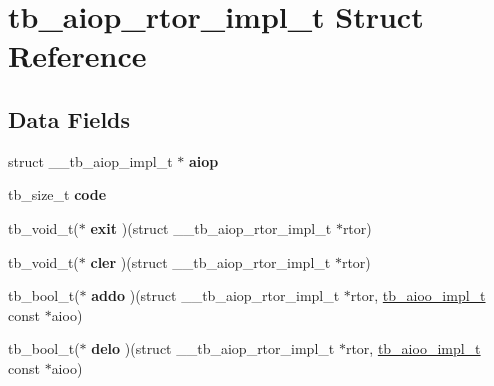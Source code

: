 \hypertarget{structtb__aiop__rtor__impl__t}{\section{tb\-\_\-aiop\-\_\-rtor\-\_\-impl\-\_\-t Struct Reference}
\label{structtb__aiop__rtor__impl__t}
}
\subsection*{Data Fields}
\begin{DoxyCompactItemize}
\item 
\hypertarget{structtb__aiop__rtor__impl__t_a2ed30f0f119bc7a4a3bf8b7a6e9f7530}{struct \-\_\-\-\_\-tb\-\_\-aiop\-\_\-impl\-\_\-t $\ast$ {\bfseries aiop}}\label{structtb__aiop__rtor__impl__t_a2ed30f0f119bc7a4a3bf8b7a6e9f7530}

\item 
\hypertarget{structtb__aiop__rtor__impl__t_abe6b9ef7542f3c279b5b801a87a54ffe}{tb\-\_\-size\-\_\-t {\bfseries code}}\label{structtb__aiop__rtor__impl__t_abe6b9ef7542f3c279b5b801a87a54ffe}

\item 
\hypertarget{structtb__aiop__rtor__impl__t_aadf27ce34b7b72a60fb269d77a5a2e9a}{tb\-\_\-void\-\_\-t($\ast$ {\bfseries exit} )(struct \-\_\-\-\_\-tb\-\_\-aiop\-\_\-rtor\-\_\-impl\-\_\-t $\ast$rtor)}\label{structtb__aiop__rtor__impl__t_aadf27ce34b7b72a60fb269d77a5a2e9a}

\item 
\hypertarget{structtb__aiop__rtor__impl__t_aec7d512a85a46d7bcfdc991da8a1dd96}{tb\-\_\-void\-\_\-t($\ast$ {\bfseries cler} )(struct \-\_\-\-\_\-tb\-\_\-aiop\-\_\-rtor\-\_\-impl\-\_\-t $\ast$rtor)}\label{structtb__aiop__rtor__impl__t_aec7d512a85a46d7bcfdc991da8a1dd96}

\item 
\hypertarget{structtb__aiop__rtor__impl__t_a26be87907238a426545a444dd7172045}{tb\-\_\-bool\-\_\-t($\ast$ {\bfseries addo} )(struct \-\_\-\-\_\-tb\-\_\-aiop\-\_\-rtor\-\_\-impl\-\_\-t $\ast$rtor, \hyperlink{structtb__aioo__impl__t}{tb\-\_\-aioo\-\_\-impl\-\_\-t} const $\ast$aioo)}\label{structtb__aiop__rtor__impl__t_a26be87907238a426545a444dd7172045}

\item 
\hypertarget{structtb__aiop__rtor__impl__t_a1e8d52e5482640c82cab9a73054e4eb3}{tb\-\_\-bool\-\_\-t($\ast$ {\bfseries delo} )(struct \-\_\-\-\_\-tb\-\_\-aiop\-\_\-rtor\-\_\-impl\-\_\-t $\ast$rtor, \hyperlink{structtb__aioo__impl__t}{tb\-\_\-aioo\-\_\-impl\-\_\-t} const $\ast$aioo)}\label{structtb__aiop__rtor__impl__t_a1e8d52e5482640c82cab9a73054e4eb3}


\end{DoxyCompactItemize}
